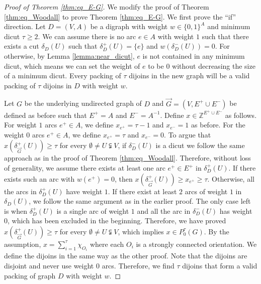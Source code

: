 \documentclass[runningheads]{llncs}
\newcommand{\Z}{\mathbb{Z}}
\begin{document}
\begin{proof}[Proof of Theorem \ref{thm:eq_E-G}]
    We modify the proof of Theorem \ref{thm:eq_Woodall} to prove Theorem \ref{thm:eq_E-G}. We first prove the ``if'' direction.
    Let $D=(V,A)$ be a digraph with weight $w\in\{0,1\}^A$ and minimum dicut $\tau\geq 2$. We can assume there is no arc $e\in A$ with weight $1$ such that there exists a cut $\delta_D(U)$ such that $\delta_D^+(U)=\{e\}$ and $w(\delta_D^-(U))=0$. For otherwise, by Lemma \ref{lemma:near_dicut}, $e$ is not contained in any minimum dicut, which means we can set the weight of $e$ to be $0$ without decreasing the size of a minimum dicut. Every packing of $\tau$ dijoins in the new graph will be a valid packing of $\tau$ dijoins in $D$ with weight $w$. 
    
    Let $G$ be the underlying undirected graph of $D$ and $\vec{G}=(V,E^+\cup E^-)$ be defined as before such that $E^+=A$ and $E^-=A^{-1}$. Define $x\in\Z^{E^+\cup E^-}$ as follows. For weight $1$ arcs $e^+\in A$, we define $x_{e^+}=\tau-1$ and $x_{e^-}=1$ as before. For the weight $0$ arcs $e^+\in A$, we define $x_{e^+}=\tau$ and $x_{e^-}=0$. To argue that $x(\delta^+_{\vec{G}}(U))\geq \tau$ for every $\emptyset \neq U\subsetneqq V$, if $\delta_D^-(U)$ is a dicut we follow the same approach as in the proof of Theorem \ref{thm:eq_Woodall}. Therefore, without loss of generality, we assume there exists at least one arc $e^+\in E^+$ in $\delta_{D}^+(U)$. If there exists such an arc with $w(e^+)=0$, then $x(\delta_{\vec{G}}^+(U))\geq x_{e^+}\geq \tau$. Otherwise, all the arcs in $\delta_D^+(U)$ have weight $1$. If there exist at least $2$ arcs of weight $1$ in $\delta_{D}(U)$, we follow the same argument as in the earlier proof. The only case left is when $\delta_{D}^+(U)$ is a single arc of weight $1$ and all the arc in $\delta_D^-(U)$ has weight $0$, which has been excluded in the beginning. Therefore, we have proved $x(\delta^+_{\vec{G}}(U))\geq \tau$ for every $\emptyset \neq U\subsetneqq V$, which implies $x\in P_0^\tau(G)$. By the assumption, $x=\sum_{i=1}^{\tau}\chi_{O_i}$ where each $O_i$ is a strongly connected orientation. We define the dijoins in the same way as the other proof. Note that the dijoins are disjoint and never use weight $0$ arcs. Therefore, we find $\tau$ dijoins that form a valid packing of graph $D$ with weight $w$.


\end{proof}
\end{document}
